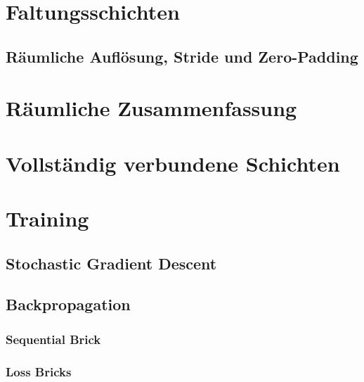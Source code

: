 	\section{Faltungsschichten} %

		\subsection{Räumliche Auflösung, Stride und Zero-Padding} %

	\section{Räumliche Zusammenfassung} %

	\section{Vollständig verbundene Schichten} %

	\section{Training} %

		\subsection{Stochastic Gradient Descent} %

		\subsection{Backpropagation} %

			\subsubsection{Sequential Brick} %

			\subsubsection{Loss Bricks} %

